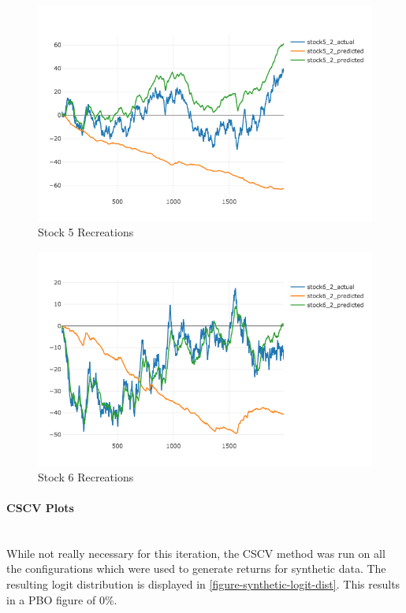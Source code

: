 \documentclass[a4paper,latin]{paper}
\begin{document}
\begin{figure}[H]
	\centering \includegraphics[scale=0.5]{images/synthetic_results/recreation_stock5.png}
	\caption{Stock 5 Recreations}
	\label{figure-synthetic-stock5-recreation}
\end{figure}

\begin{figure}[H]
	\centering \includegraphics[scale=0.5]{images/synthetic_results/recreation_stock6.png}
	\caption{Stock 6 Recreations}
	\label{figure-synthetic-stock6-recreation}
\end{figure}

\paragraph{CSCV Plots}\mbox{}\\

While not really necessary for this iteration, the CSCV method was run on all the configurations which were used to generate returns for synthetic data. The resulting logit distribution is displayed in \ref{figure-synthetic-logit-dist}. This results in a PBO figure of 0\%.
\end{document}
